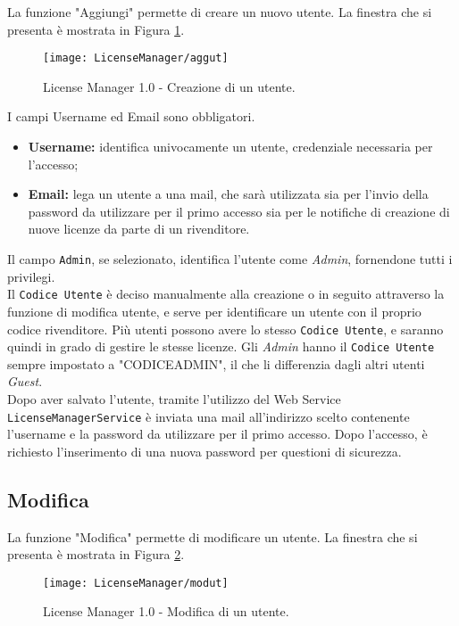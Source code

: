 La funzione "Aggiungi" permette di creare un nuovo utente. La finestra che si presenta è mostrata in Figura \ref{agg}.

\begin{figure}[!h] 
    \centering 
    \texttt{[image: LicenseManager/aggut]} 
    \caption{License Manager 1.0 - Creazione di un utente.}
\label{agg}

\end{figure}

I campi Username ed Email sono obbligatori.
\begin{itemize}
\item \textbf{Username:} identifica univocamente un utente, credenziale necessaria per l’accesso;
\item \textbf{Email:} lega un utente a una mail, che sarà utilizzata sia per l’invio della password da utilizzare per il primo accesso sia per le notifiche di creazione di nuove licenze da parte di un rivenditore.
\end{itemize}
Il campo \texttt{Admin}, se selezionato, identifica l’utente come \textit{Admin}, fornendone tutti i privilegi.\\
Il \texttt{Codice Utente} è deciso manualmente alla creazione o in seguito attraverso la funzione di modifica utente, e serve per identificare un utente con il proprio codice rivenditore. Più utenti possono avere lo stesso \texttt{Codice Utente}, e saranno quindi in grado di gestire le stesse licenze. Gli \textit{Admin} hanno il \texttt{Codice Utente} sempre impostato a "CODICEADMIN", il che li differenzia dagli altri utenti \textit{Guest}.\\
Dopo aver salvato l’utente, tramite l'utilizzo del Web Service \texttt{LicenseManagerService} è inviata una mail all’indirizzo scelto contenente l’username e la password da utilizzare per il primo accesso. Dopo l’accesso, è richiesto l’inserimento di una nuova password per questioni di sicurezza.


\subsection{Modifica}

La funzione "Modifica" permette di modificare un utente. La finestra che si presenta è mostrata in Figura \ref{mod}.

\begin{figure}[!h] 
    \centering 
    \texttt{[image: LicenseManager/modut]} 
    \caption{License Manager 1.0 - Modifica di un utente.}
\label{mod}

\end{figure}

